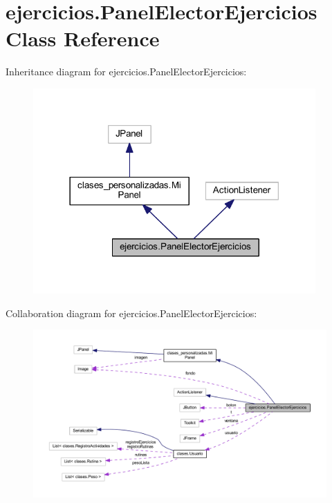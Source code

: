 \hypertarget{classejercicios_1_1_panel_elector_ejercicios}{}\section{ejercicios.\+Panel\+Elector\+Ejercicios Class Reference}
\label{classejercicios_1_1_panel_elector_ejercicios}


Inheritance diagram for ejercicios.\+Panel\+Elector\+Ejercicios\+:
\nopagebreak
\begin{figure}[H]
\begin{center}
\leavevmode
\includegraphics[width=306pt]{classejercicios_1_1_panel_elector_ejercicios__inherit__graph}
\end{center}
\end{figure}


Collaboration diagram for ejercicios.\+Panel\+Elector\+Ejercicios\+:
\nopagebreak
\begin{figure}[H]
\begin{center}
\leavevmode
\includegraphics[width=350pt]{classejercicios_1_1_panel_elector_ejercicios__coll__graph}
\end{center}
\end{figure}
